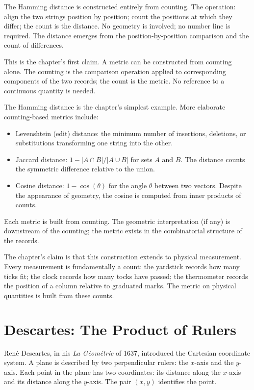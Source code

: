 The Hamming distance is constructed entirely from counting. The
operation: align the two strings position by position; count the
positions at which they differ; the count is the distance. No
geometry is involved; no number line is required. The distance
emerges from the position-by-position comparison and the count of
differences.

This is the chapter's first claim. A metric can be constructed
from counting alone. The counting is the comparison operation
applied to corresponding components of the two records; the
count is the metric. No reference to a continuous quantity is
needed.

The Hamming distance is the chapter's simplest example. More
elaborate counting-based metrics include:
\begin{itemize}
\item Levenshtein (edit) distance: the minimum number of
insertions, deletions, or substitutions transforming one string
into the other.
\item Jaccard distance: $1 - |A \cap B| / |A \cup B|$ for sets $A$
and $B$. The distance counts the symmetric difference relative
to the union.
\item Cosine distance: $1 - \cos(\theta)$ for the angle $\theta$
between two vectors. Despite the appearance of geometry, the
cosine is computed from inner products of counts.
\end{itemize}

Each metric is built from counting. The geometric interpretation
(if any) is downstream of the counting; the metric exists in the
combinatorial structure of the records.

The chapter's claim is that this construction extends to physical
measurement. Every measurement is fundamentally a count: the
yardstick records how many ticks fit; the clock records how many
tocks have passed; the thermometer records the position of a
column relative to graduated marks. The metric on physical
quantities is built from these counts.

\section{Descartes: The Product of Rulers}
\label{se:descartes-the-product-of-rulers}

Ren\'e Descartes, in his \emph{La G\'eom\'etrie} of 1637,
introduced the Cartesian coordinate system. A plane is described by
two perpendicular rulers: the $x$-axis and the $y$-axis. Each point
in the plane has two coordinates: its distance along the $x$-axis
and its distance along the $y$-axis. The pair $(x, y)$ identifies
the point.

